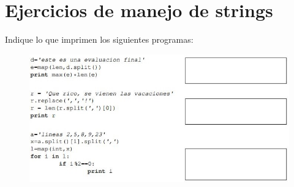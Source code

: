 \section{Ejercicios de manejo de strings}
Indique lo que imprimen los siguientes programas:
\begin{figure}[h]
    \centering
    \includegraphics{Guia/imagen1.jpg}
\end{figure}